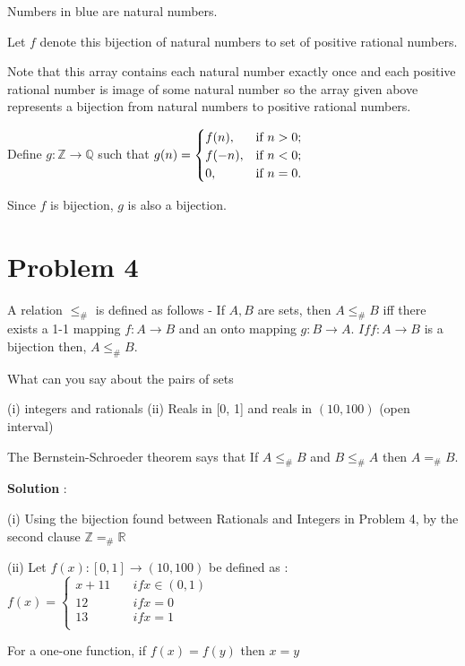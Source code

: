 \documentclass{article}
\begin{document}
    \quad Numbers in blue are natural numbers. 
    
    \quad Let $f$ denote this bijection of natural numbers to set of positive rational numbers.
    
    \quad Note that this array contains each natural number exactly once and each positive rational number is image of some natural number so the array given above represents a bijection from natural numbers to positive rational numbers. 
    
    \quad Define $g: \mathbb{Z}\rightarrow \mathbb{Q}$ such that $g(n)= \begin{cases}
        f(n), & \hbox{if $n>0$;} \\
        f(-n), & \hbox{if $n<0$;} \\
        0, & \hbox{if $n=0$.}
    \end{cases}$

    \quad Since $f$ is bijection, $g$ is also a bijection.

    \section*{Problem 4}  A relation $ \leq_{\#}$ is defined as follows - If $A, B$ are sets, then $A \leq_{\#} B$ iff there exists a 1-1 mapping $f : A \rightarrow B$ and an onto mapping $g : B \rightarrow A$. $If f : A \rightarrow B$ is a bijection then, $A\leq_{\#} B$.
    
What can you say about the pairs of sets

(i) integers and rationals (ii) Reals in [0, 1] and reals in $(10, 100)$ (open interval)

The Bernstein-Schroeder theorem says that If $A \leq_{\#} B$ and $B \leq_{\#} A$ then $A =_{\#} B$.
    
\textbf{Solution} :

    (i) Using the bijection found between Rationals and Integers in Problem 4, by the second clause $\mathbb{Z} =_{\#} \mathbb{R}$
    
    (ii) Let $f(x): [0,1] \to (10, 100)$  be defined as : $f(x) = 
        \begin{cases}
               x+11 & \quad if x \in (0, 1)\\
               12 & \quad if x = 0\\
               13 & \quad if x = 1 \\
            \end{cases}$
            
    \quad For a one-one function, if $f(x) = f(y)$ then $x = y$
    
\end{document}
